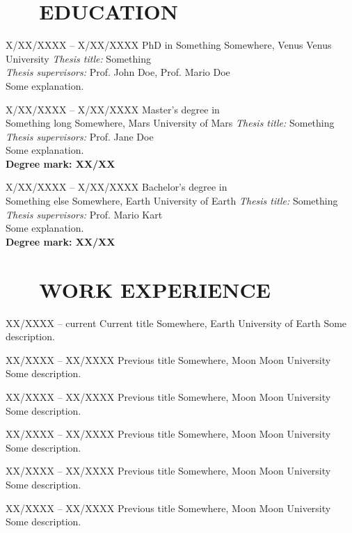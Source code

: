 \documentclass[a4paper,11pt,SidebarWidth=8.6cm]{academic_cv}
\begin{document}
\section*{\faGraduationCap{}~~~EDUCATION}

\EduWorkEntry
  {X/XX/XXXX – X/XX/XXXX}
  {PhD in Something}
  {Somewhere, Venus}
  {Venus University}
  {\textit{Thesis title:} Something \\
  \textit{Thesis supervisors:} Prof. John Doe, Prof. Mario Doe \\
  Some explanation.}

\EduWorkEntry
  {X/XX/XXXX – X/XX/XXXX}
  {Master's degree in \\Something long}
  {Somewhere, Mars}
  {University of Mars}
  {\textit{Thesis title:} Something \\
  \textit{Thesis supervisors:} Prof. Jane Doe \\
  Some explanation.\\
  \textbf{Degree mark: XX/XX}}

\EduWorkEntry
  {X/XX/XXXX – X/XX/XXXX}
  {Bachelor's degree in \\Something else}
  {Somewhere, Earth}
  {University of Earth}
  {\textit{Thesis title:} Something \\
  \textit{Thesis supervisors:} Prof. Mario Kart \\
  Some explanation.\\
  \textbf{Degree mark: XX/XX}}

\section*{\faBriefcase{}~~~WORK EXPERIENCE}

\EduWorkEntry
  {XX/XXXX – current}
  {Current title}
  {Somewhere, Earth}
  {University of Earth}
  {Some description.}

\EduWorkEntry
  {XX/XXXX – XX/XXXX}
  {Previous title}
  {Somewhere, Moon}
  {Moon University}
  {Some description.}

\EduWorkEntry
  {XX/XXXX – XX/XXXX}
  {Previous title}
  {Somewhere, Moon}
  {Moon University}
  {Some description.}

\EduWorkEntry
  {XX/XXXX – XX/XXXX}
  {Previous title}
  {Somewhere, Moon}
  {Moon University}
  {Some description.}

\EduWorkEntry
  {XX/XXXX – XX/XXXX}
  {Previous title}
  {Somewhere, Moon}
  {Moon University}
  {Some description.}

\EduWorkEntry
  {XX/XXXX – XX/XXXX}
  {Previous title}
  {Somewhere, Moon}
  {Moon University}
  {Some description.}
\end{document}

